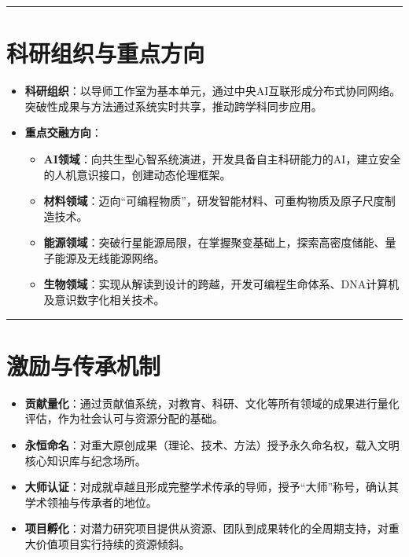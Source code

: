 \begin{center}\rule{0.5\linewidth}{0.5pt}\end{center}

\section{科研组织与重点方向}\label{ux79d1ux7814ux7ec4ux7ec7ux4e0eux91cdux70b9ux65b9ux5411}

\begin{itemize}
\item
  \textbf{科研组织}：以导师工作室为基本单元，通过中央AI互联形成分布式协同网络。突破性成果与方法通过系统实时共享，推动跨学科同步应用。
\item
  \textbf{重点交融方向}：

  \begin{itemize}
  \tightlist
  \item
    \textbf{AI领域}：向共生型心智系统演进，开发具备自主科研能力的AI，建立安全的人机意识接口，创建动态伦理框架。
  \item
    \textbf{材料领域}：迈向``可编程物质''，研发智能材料、可重构物质及原子尺度制造技术。
  \item
    \textbf{能源领域}：突破行星能源局限，在掌握聚变基础上，探索高密度储能、量子能源及无线能源网络。
  \item
    \textbf{生物领域}：实现从解读到设计的跨越，开发可编程生命体系、DNA计算机及意识数字化相关技术。
  \end{itemize}
\end{itemize}

\begin{center}\rule{0.5\linewidth}{0.5pt}\end{center}

\section{激励与传承机制}\label{ux6fc0ux52b1ux4e0eux4f20ux627fux673aux5236}

\begin{itemize}
\item
  \textbf{贡献量化}：通过贡献值系统，对教育、科研、文化等所有领域的成果进行量化评估，作为社会认可与资源分配的基础。
\item
  \textbf{永恒命名}：对重大原创成果（理论、技术、方法）授予永久命名权，载入文明核心知识库与纪念场所。
\item
  \textbf{大师认证}：对成就卓越且形成完整学术传承的导师，授予``大师''称号，确认其学术领袖与传承者的地位。
\item
  \textbf{项目孵化}：对潜力研究项目提供从资源、团队到成果转化的全周期支持，对重大价值项目实行持续的资源倾斜。
\end{itemize}

